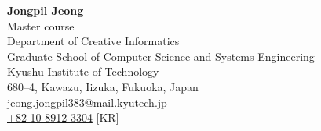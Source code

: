 \documentclass[a4paper,9pt]{extarticle}
\begin{document}
\pagestyle{fancy}
\renewcommand{\headrulewidth}{0pt}
\fancyhead{}
\thispagestyle{empty} %

\begin{flushleft}
\href{https://scholar.google.com/citations?user=O-3pYeQAAAAJ&hl=en}{\textbf{\LARGE Jongpil Jeong}}\\[2pt] %
Master course \\ 
Department of Creative Informatics \\ 
Graduate School of Computer Science and Systems Engineering \\ 
Kyushu Institute of Technology \\ 
680--4, Kawazu, Iizuka, Fukuoka, Japan \\ 
\href{mailto:jeong.jongpil383@mail.kyutech.jp}{jeong.jongpil383@mail.kyutech.jp} \\%
\href{tel:+82-10-8912-3304}{+82-10-8912-3304} [KR]
\end{flushleft} 



\end{document}
